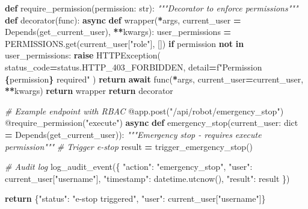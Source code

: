 \documentclass[
]{article}
\newenvironment{Shaded}{\begin{snugshade}}{\end{snugshade}}
\newcommand{\AttributeTok}[1]{\textcolor[rgb]{0.13,0.29,0.53}{#1}}
\newcommand{\BuiltInTok}[1]{#1}
\newcommand{\CommentTok}[1]{\textcolor[rgb]{0.56,0.35,0.01}{\textit{#1}}}
\newcommand{\ControlFlowTok}[1]{\textcolor[rgb]{0.13,0.29,0.53}{\textbf{#1}}}
\newcommand{\KeywordTok}[1]{\textcolor[rgb]{0.13,0.29,0.53}{\textbf{#1}}}
\newcommand{\NormalTok}[1]{#1}
\newcommand{\OperatorTok}[1]{\textcolor[rgb]{0.81,0.36,0.00}{\textbf{#1}}}
\newcommand{\SpecialCharTok}[1]{\textcolor[rgb]{0.81,0.36,0.00}{\textbf{#1}}}
\newcommand{\SpecialStringTok}[1]{\textcolor[rgb]{0.31,0.60,0.02}{#1}}
\newcommand{\StringTok}[1]{\textcolor[rgb]{0.31,0.60,0.02}{#1}}
\begin{document}
\begin{Shaded}
\begin{Highlighting}[]
\KeywordTok{def}\NormalTok{ require\_permission(permission: }\BuiltInTok{str}\NormalTok{):}
    \CommentTok{"""Decorator to enforce permissions"""}
    \KeywordTok{def}\NormalTok{ decorator(func):}
        \ControlFlowTok{async} \KeywordTok{def}\NormalTok{ wrapper(}\OperatorTok{*}\NormalTok{args, current\_user }\OperatorTok{=}\NormalTok{ Depends(get\_current\_user), }\OperatorTok{**}\NormalTok{kwargs):}
\NormalTok{            user\_permissions }\OperatorTok{=}\NormalTok{ PERMISSIONS.get(current\_user[}\StringTok{"role"}\NormalTok{], [])}
            \ControlFlowTok{if}\NormalTok{ permission }\KeywordTok{not} \KeywordTok{in}\NormalTok{ user\_permissions:}
                \ControlFlowTok{raise}\NormalTok{ HTTPException(}
\NormalTok{                    status\_code}\OperatorTok{=}\NormalTok{status.HTTP\_403\_FORBIDDEN,}
\NormalTok{                    detail}\OperatorTok{=}\SpecialStringTok{f"Permission \textquotesingle{}}\SpecialCharTok{\{}\NormalTok{permission}\SpecialCharTok{\}}\SpecialStringTok{\textquotesingle{} required"}
\NormalTok{                )}
            \ControlFlowTok{return} \ControlFlowTok{await}\NormalTok{ func(}\OperatorTok{*}\NormalTok{args, current\_user}\OperatorTok{=}\NormalTok{current\_user, }\OperatorTok{**}\NormalTok{kwargs)}
        \ControlFlowTok{return}\NormalTok{ wrapper}
    \ControlFlowTok{return}\NormalTok{ decorator}

\CommentTok{\# Example endpoint with RBAC}
\AttributeTok{@app.post}\NormalTok{(}\StringTok{"/api/robot/emergency\_stop"}\NormalTok{)}
\AttributeTok{@require\_permission}\NormalTok{(}\StringTok{"execute"}\NormalTok{)}
\ControlFlowTok{async} \KeywordTok{def}\NormalTok{ emergency\_stop(current\_user: }\BuiltInTok{dict} \OperatorTok{=}\NormalTok{ Depends(get\_current\_user)):}
    \CommentTok{"""Emergency stop {-} requires \textquotesingle{}execute\textquotesingle{} permission"""}
    \CommentTok{\# Trigger e{-}stop}
\NormalTok{    result }\OperatorTok{=}\NormalTok{ trigger\_emergency\_stop()}

    \CommentTok{\# Audit log}
\NormalTok{    log\_audit\_event(\{}
        \StringTok{"action"}\NormalTok{: }\StringTok{"emergency\_stop"}\NormalTok{,}
        \StringTok{"user"}\NormalTok{: current\_user[}\StringTok{"username"}\NormalTok{],}
        \StringTok{"timestamp"}\NormalTok{: datetime.utcnow(),}
        \StringTok{"result"}\NormalTok{: result}
\NormalTok{    \})}

    \ControlFlowTok{return}\NormalTok{ \{}\StringTok{"status"}\NormalTok{: }\StringTok{"e{-}stop triggered"}\NormalTok{, }\StringTok{"user"}\NormalTok{: current\_user[}\StringTok{"username"}\NormalTok{]\}}
\end{Highlighting}
\end{Shaded}
\end{document}
